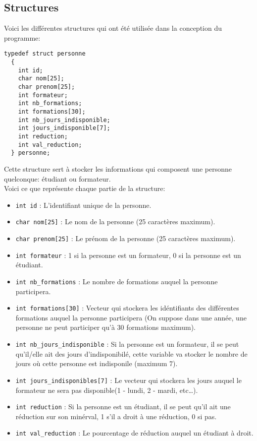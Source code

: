 \documentclass[10pt]{article}
\begin{document}
\subsection{Structures}
Voici les différentes structures qui ont été utilisée dans la conception du programme:

\begin{lstlisting}[firstnumber=30]
  typedef struct personne
  {
    int id;
    char nom[25];
    char prenom[25];
    int formateur;
    int nb_formations;
    int formations[30];
    int nb_jours_indisponible;
    int jours_indisponible[7];
    int reduction;
    int val_reduction;
  } personne;
\end{lstlisting}

Cette structure sert à stocker les informations qui composent une personne quelconque: étudiant ou formateur.\\
Voici ce que représente chaque partie de la structure:
\begin{itemize}
\item \texttt{int id} : L'identifiant unique de la personne.
\item \texttt{char nom[25]} : Le nom de la personne (25 caractères maximum).
\item \texttt{char prenom[25]} : Le prénom de la personne (25 caractères maximum).
\item \texttt{int formateur} : 1 si la personne est un formateur, 0 si la personne est un étudiant.
\item \texttt{int nb\_formations} : Le nombre de formations auquel la personne participera.
\item \texttt{int formations[30]} : Vecteur qui stockera les idéntifiants des différentes formations auquel la personne participera (On suppose dans une année, une personne ne peut participer qu'à 30 formations maximum).
\item \texttt{int nb\_jours\_indisponible} : Si la personne est un formateur, il se peut qu'il/elle ait des jours d'indisponibilé, cette variable va stocker le nombre de jours où cette personne est indisponile (maximum 7).
\item \texttt{int jours\_indisponibles[7]} : Le vecteur qui stockera les jours auquel le formateur ne sera pas disponible(1 - lundi, 2 - mardi, etc\ldots).
\item \texttt{int reduction} : Si la personne est un étudiant, il se peut qu'il ait une réduction sur son minérval, 1 s'il a droit à une réduction, 0 si pas.
\item \texttt{int val\_reduction} : Le pourcentage de réduction auquel un étudiant à droit.
\end{itemize}
\end{document}
